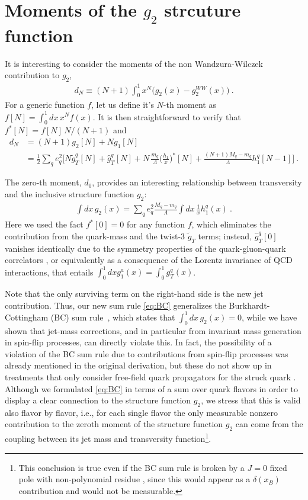 \documentclass[preprintnumbers,floatfix,nofootinbib]{revtex4}
\newcommand{\xbj}{{x_B}}                   %
\newcommand{\mj}{M_q}
\newcommand{\mq}{m_q}
\begin{document}
\section{Moments of the $g_2$ strcuture function}

It is interesting to consider the moments of the non Wandzura-Wilczek contribution to $g_2$,
\begin{align}
  d_N \equiv (N+1) \int_0^1 x^N \bigg( g_2(x) - g_2^{WW}(x) \bigg) \ .
\end{align}
For a generic function $f$, let us define it's $N$-th moment as $f[N]=\int_0^1 dx\, x^{N} f(x)$. It is then straightforward to verify that $f^*[N] = f[N]\,N/(N+1)$ and  
\begin{align}
  d_N & = (N+1) g_2[N] + N g_1[N] \\
  & = \frac12 \sum_q e_q^2 \bigg[ N \tilde g_T^q[N] + \hat g_T^q[N]
    + N \,\frac{m_q}{\Lambda} \bigg(\frac{h_1}{x}\bigg)^{\!\!*}\![N]
    + \frac{(N+1) \mj-\mq}{\Lambda} h_1^q[N-1] \bigg] \ .
\end{align}

The zero-th moment, $d_0$, provides an interesting relationship between transversity and the inclusive structure function $g_2$:
\begin{align}
  \label{eq:BC}
  \int dx\, g_2(x) = \sum_q e_q^2 \frac{\mj-\mq}{\Lambda} \int dx\, \frac{1}{x} h_1^q(x) \ .
\end{align}
Here we used the fact $f^*[0]=0$ for any function $f$, which eliminates the contribution from the quark-mass and the twist-3 $\widetilde g_T$ terms; instead, $\widehat g_T^q[0]$ vanishes identically due to the symmetry
properties of the quark-gluon-quark correlators \cite{Accardi:2009au}, or equivalently as a consequence of the Lorentz invariance of QCD interactions, that entails $\int_0^1 dx g_1^a(x) = \int_0^1 g_T^q(x)$. 

Note that the only surviving term on the right-hand side is the new jet contribution. Thus, our new sum rule \eqref{eq:BC}
generalizes the Burkhardt-Cottingham (BC) sum rule~\cite{Burkhardt:1970ti},
which states that  $\int_0^1 dx\, g_2(x) =0$, while we have shown that jet-mass corrections, and in particular from invariant mass generation in spin-flip processes,  can directly violate this.
In fact, the possibility of a violation of the BC sum rule due to 
contributions from spin-flip processes was already mentioned in the original
derivation, but these do not show up in treatments that only
consider free-field quark propagators for the struck quark
\cite{Jaffe:1996zw}.  Although we formulated \eqref{eq:BC} in terms of a sum over quark flavors in order to display a clear
connection to the structure function $g_2$, we stress that this is valid also
flavor by flavor, i.e., for each single flavor the only measurable nonzero contribution to the zeroth moment of the
structure function $g_2$ can come from the coupling between its jet mass and transversity function\footnote{This conclusion is true even if the BC sum rule is broken by a $J = 0$ fixed pole with
non-polynomial residue \cite{Jaffe:1996zw}, since this would appear as a
$\delta(\xbj)$ contribution and would not be measurable.}.
\end{document}
